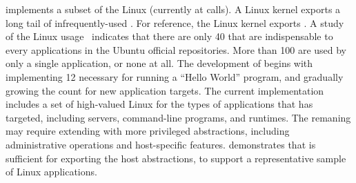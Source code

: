 \Thelibos{} implements a subset 
of the Linux \linuxapis{} (currently at \graphenesyscallnum{} calls).
A Linux kernel exports a long tail of infrequently-used \linuxapis{}.
For reference, the Linux \linuxversion{} kernel exports \linuxsyscallnum{} \linuxapis{}.
A study of the Linux \linuxapi{} usage~\cite{tsai16apistudy}
indicates that there are only 40 \linuxapis{} that are indispensable to every applications in the Ubuntu official repositories.
More than 100 \linuxapis{} are used by only a single application,
or none at all.
The development of \thelibos{} begins with
implementing 12 \linuxapis{} necessary for running a ``Hello World'' program,
and gradually growing the \linuxapi{} count
for new application targets.
The current \thelibos{} implementation
includes a set of high-valued Linux \linuxapis{} for the types of applications
that \graphene{} has targeted,
including servers, command-line programs, and runtimes.
The remaning \linuxapis{} may require extending \thehostabi{} with more privileged abstractions,
including administrative operations
and host-specific features.
\thelibos{} demonstrates that \thehostabi{} is sufficient
for exporting the host abstractions, to support a representative sample of Linux applications.









